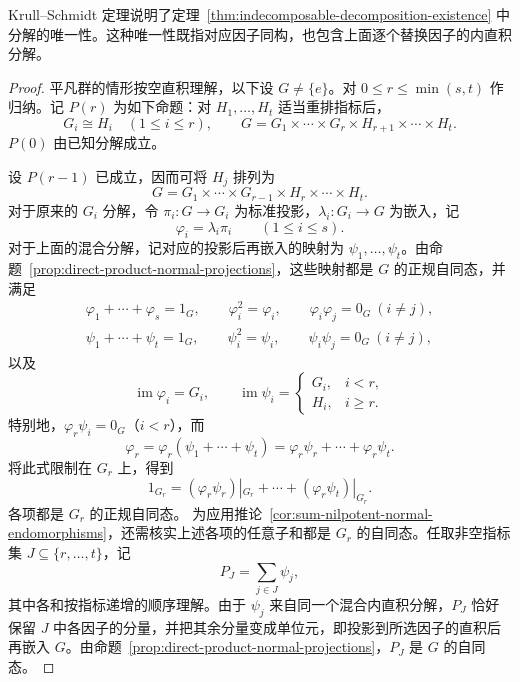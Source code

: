 \begin{purplenote}
Krull--Schmidt 定理说明了定理~\ref{thm:indecomposable-decomposition-existence} 中分解的唯一性。这种唯一性既指对应因子同构，也包含上面逐个替换因子的内直积分解。
\end{purplenote}

\begin{proof}
平凡群的情形按空直积理解，以下设 $G\ne\{e\}$。对
$0\leq r\leq\min(s,t)$ 作归纳。记 $P(r)$ 为如下命题：对 $H_1,\ldots,H_t$ 适当重排指标后，
\[
  G_i\cong H_i\quad(1\leq i\leq r),
  \qquad
  G=G_1\times\cdots\times G_r\times H_{r+1}\times\cdots\times H_t.
\]
$P(0)$ 由已知分解成立。

设 $P(r-1)$ 已成立，因而可将 $H_j$ 排列为
\[
  G=G_1\times\cdots\times G_{r-1}\times H_r\times\cdots\times H_t.
\]
对于原来的 $G_i$ 分解，令 $\pi_i:G\to G_i$ 为标准投影，$\lambda_i:G_i\to G$ 为嵌入，记
\[
  \varphi_i=\lambda_i\pi_i\qquad(1\leq i\leq s).
\]
对于上面的混合分解，记对应的投影后再嵌入的映射为 $\psi_1,\ldots,\psi_t$。由命题~\ref{prop:direct-product-normal-projections}，这些映射都是 $G$ 的正规自同态，并满足
\[
  \begin{gathered}
    \varphi_1+\cdots+\varphi_s=1_G,\qquad
    \varphi_i^2=\varphi_i,\qquad
    \varphi_i\varphi_j=0_G\ (i\ne j),\\
    \psi_1+\cdots+\psi_t=1_G,\qquad
    \psi_i^2=\psi_i,\qquad
    \psi_i\psi_j=0_G\ (i\ne j),
  \end{gathered}
\]
以及
\[
  \operatorname{im}\varphi_i=G_i,\qquad
  \operatorname{im}\psi_i=
  \begin{cases}
    G_i,&i<r,\\
    H_i,&i\geq r.
  \end{cases}
\]
特别地，$\varphi_r\psi_i=0_G$（$i<r$），而
\[
  \varphi_r
  =\varphi_r(\psi_1+\cdots+\psi_t)
  =\varphi_r\psi_r+\cdots+\varphi_r\psi_t.
\]
将此式限制在 $G_r$ 上，得到
\[
  1_{G_r}
  =(\varphi_r\psi_r)|_{G_r}+\cdots+(\varphi_r\psi_t)|_{G_r}.
\]
各项都是 $G_r$ 的正规自同态。
为应用推论~\ref{cor:sum-nilpotent-normal-endomorphisms}，还需核实上述各项的任意子和都是 $G_r$ 的自同态。任取非空指标集 $J\subseteq\{r,\ldots,t\}$，记
\[
  P_J=\sum_{j\in J}\psi_j,
\]
其中各和按指标递增的顺序理解。由于 $\psi_j$ 来自同一个混合内直积分解，$P_J$ 恰好保留 $J$ 中各因子的分量，并把其余分量变成单位元，即投影到所选因子的直积后再嵌入 $G$。由命题~\ref{prop:direct-product-normal-projections}，$P_J$ 是 $G$ 的自同态。


\end{proof}
